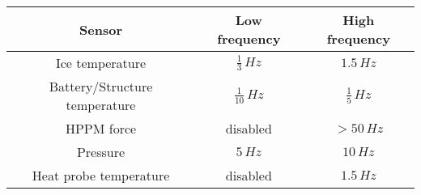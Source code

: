 \documentclass[12pt, a4paper]{scrreprt}
\begin{document}
\begin{tabular}{|c|c|c|}
	\hline 
	Sensor & Low frequency & High frequency \\ 
	\hline 
	Ice temperature & $\frac{1}{3}\,Hz$ & $1.5\,Hz$ \\ 
	\hline 
	Battery/Structure temperature & $\frac{1}{10}\,Hz$ & $\frac{1}{5}\,Hz$ \\ 
	\hline 
	HPPM force & disabled & $>50\,Hz$ \\ 
	\hline 
	Pressure & $5\,Hz$ & $10\,Hz$ \\ 
	\hline 
	Heat probe temperature & disabled & $1.5\,Hz$ \\ 
	\hline 
\end{tabular}
\end{document}
